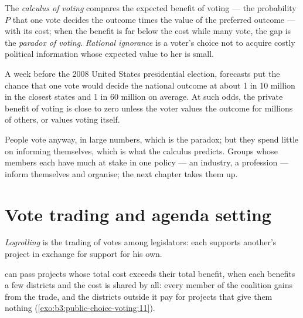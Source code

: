\begin{definition}\label{def:b3:public-choice-voting:turnout}
The \emph{calculus of voting} compares the expected benefit of voting --- the
probability $P$ that one vote decides the outcome times the value of the preferred
outcome --- with its cost; when the benefit is far below the cost while many vote,
the gap is the \emph{paradox of voting}. \emph{Rational ignorance} is a voter's choice
not to acquire costly political information whose expected value to her is small.
\end{definition}

\begin{measure}
A week before the 2008 United States presidential election, forecasts put the
chance that one vote would decide the national outcome at about 1 in 10 million in
the closest states and 1 in 60 million on average. %
At such odds, the private benefit of voting is close to zero unless the voter
values the outcome for millions of others, or values voting itself.
\end{measure}

People vote anyway, in large numbers, which is the paradox; but they spend little
on informing themselves, which is what the calculus predicts. Groups whose members
each have much at stake in one policy --- an industry, a profession --- inform
themselves and organise; the next chapter takes them up.

\section{Vote trading and agenda setting}\label{sec:b3:public-choice-voting:agenda}

\begin{definition}[Logrolling]\label{def:b3:public-choice-voting:logrolling}
\emph{Logrolling} is the trading of votes among legislators: each supports
another's project in exchange for support for his own.
\end{definition}

 can pass projects whose total cost exceeds their total benefit, when
each benefits a few districts and the cost is shared by all: every member of the
coalition gains from the trade, and the districts outside it pay for projects that
give them nothing (\cref{exo:b3:public-choice-voting:11}).

